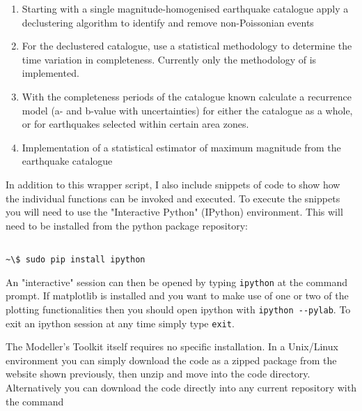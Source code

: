 \begin{enumerate}

\item Starting with a single magnitude-homogenised earthquake catalogue apply a declustering algorithm to identify and remove non-Poissonian events

\item For the declustered catalogue, use a statistical methodology to determine the time variation in completeness. Currently only the methodology of \cite{Stepp1971} is implemented.

\item With the completeness periods of the catalogue known calculate a \cite{GutenbergRichter1944} recurrence model (a- and b-value with uncertainties) for either the catalogue as a whole, or for earthquakes selected within certain area zones.

\item Implementation of a statistical estimator of maximum magnitude from the earthquake catalogue  

\end{enumerate}

In addition to this wrapper script, I also include snippets of code to show how the individual functions can be invoked and executed. To execute the snippets you will need to use the "Interactive Python" (IPython) environment. This will need to be installed from the python package repository:

\begin{Verbatim}[frame=single, commandchars=\\\{\}, fontsize=\scriptsize]

~\$ sudo pip install ipython

\end{Verbatim}

An "interactive" session can then be opened by typing \verb=ipython= at the command prompt. If matplotlib is installed and you want to make use of one or two of the plotting functionalities then you should open ipython with \verb=ipython --pylab=. To exit an ipython session at any time simply type \verb=exit=.

The Modeller's Toolkit itself requires no specific installation. In a Unix/Linux environment you can simply download the code as a zipped package from the website shown previously, then unzip and move into the code directory.
Alternatively you can download the code directly into  any current repository with the command


